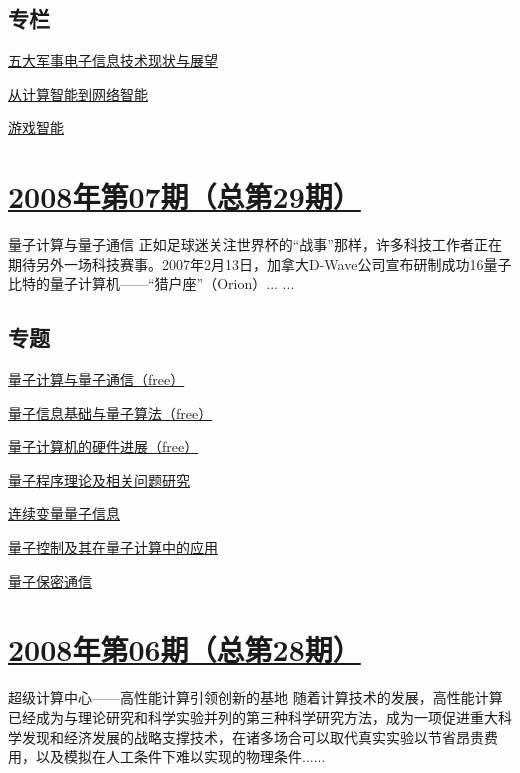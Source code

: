 \documentclass[a4paper]{article}
\begin{document}
\subsection{专栏}
\href{http://history.ccf.org.cn/resources/1190201776262/2010/04/15/030074.pdf}{五大军事电子信息技术现状与展望}

\href{http://history.ccf.org.cn/resources/1190201776262/2010/04/15/030082.pdf}{从计算智能到网络智能}

\href{http://history.ccf.org.cn/resources/1190201776262/2010/04/15/030086.pdf}{游戏智能}


\section{\href{http://history.ccf.org.cn/sites/ccf/jsjtbbd.jsp?contentId=2542567629004}{\textbf{2008年第07期（总第29期）}}}
量子计算与量子通信 正如足球迷关注世界杯的“战事”那样，许多科技工作者正在期待另外一场科技赛事。2007年2月13日，加拿大D-Wave公司宣布研制成功16量子比特的量子计算机——“猎户座”（Orion）... ...
\subsection{专题}
\href{http://history.ccf.org.cn/resources/1190201776262/2010/04/15/029012.pdf}{量子计算与量子通信（free）}

\href{http://history.ccf.org.cn/resources/1190201776262/2010/04/15/029014.pdf}{量子信息基础与量子算法（free）}

\href{http://history.ccf.org.cn/resources/1190201776262/2010/04/15/029025.pdf}{量子计算机的硬件进展（free）}

\href{http://history.ccf.org.cn/resources/1190201776262/2010/04/15/029044.pdf}{量子程序理论及相关问题研究}

\href{http://history.ccf.org.cn/resources/1190201776262/2010/04/15/029057.pdf}{连续变量量子信息}

\href{http://history.ccf.org.cn/resources/1190201776262/2010/04/15/029065.pdf}{量子控制及其在量子计算中的应用}

\href{http://history.ccf.org.cn/resources/1190201776262/2010/04/15/029072.pdf}{量子保密通信}


\section{\href{http://history.ccf.org.cn/sites/ccf/jsjtbbd.jsp?contentId=2542567629001}{\textbf{2008年第06期（总第28期）}}}
超级计算中心——高性能计算引领创新的基地 随着计算技术的发展，高性能计算已经成为与理论研究和科学实验并列的第三种科学研究方法，成为一项促进重大科学发现和经济发展的战略支撑技术，在诸多场合可以取代真实实验以节省昂贵费用，以及模拟在人工条件下难以实现的物理条件......
\end{document}
